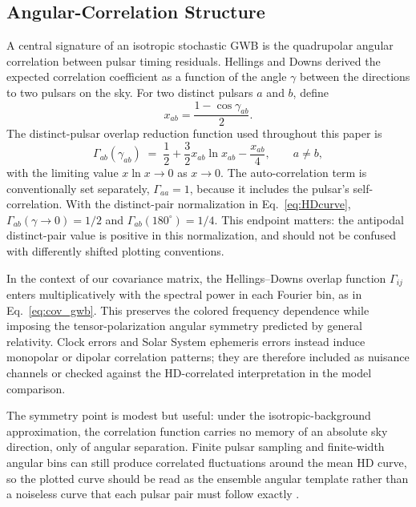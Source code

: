 \documentclass[symmetry,article,submit,pdftex,moreauthors]{Definitions/mdpi}
\begin{document}
\subsection{Angular-Correlation Structure}\label{subsec:HD}
A central signature of an isotropic stochastic GWB is the quadrupolar angular correlation between pulsar timing residuals. Hellings and Downs \cite{Hellings1983} derived the expected correlation coefficient as a function of the angle $\gamma$ between the directions to two pulsars on the sky. For two distinct pulsars $a$ and $b$, define
\[
    x_{ab}=\frac{1-\cos\gamma_{ab}}{2}.
\]
The distinct-pulsar overlap reduction function used throughout this paper is
\begin{equation}\label{eq:HDcurve}
    \Gamma_{ab}(\gamma_{ab}) \;=\; \frac{1}{2}+\frac{3}{2}x_{ab}\ln x_{ab}-\frac{x_{ab}}{4},\qquad a\neq b,
\end{equation}
with the limiting value $x\ln x\to0$ as $x\to0$. The auto-correlation term is conventionally set separately, $\Gamma_{aa}=1$, because it includes the pulsar's self-correlation. With the distinct-pair normalization in Eq.~\eqref{eq:HDcurve}, $\Gamma_{ab}(\gamma\to0)=1/2$ and $\Gamma_{ab}(180^\circ)=1/4$. This endpoint matters: the antipodal distinct-pair value is positive in this normalization, and should not be confused with differently shifted plotting conventions.

In the context of our covariance matrix, the Hellings--Downs overlap function $\Gamma_{ij}$ enters multiplicatively with the spectral power in each Fourier bin, as in Eq.~\eqref{eq:cov_gwb}. This preserves the colored frequency dependence while imposing the tensor-polarization angular symmetry predicted by general relativity. Clock errors and Solar System ephemeris errors instead induce monopolar or dipolar correlation patterns; they are therefore included as nuisance channels or checked against the HD-correlated interpretation in the model comparison.

The symmetry point is modest but useful: under the isotropic-background approximation, the correlation function carries no memory of an absolute sky direction, only of angular separation. Finite pulsar sampling and finite-width angular bins can still produce correlated fluctuations around the mean HD curve, so the plotted curve should be read as the ensemble angular template rather than a noiseless curve that each pulsar pair must follow exactly \cite{AllenRomano2023HD}.
\end{document}
